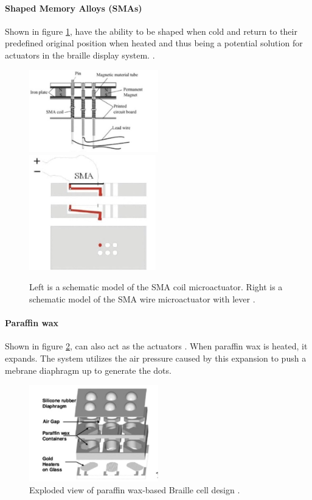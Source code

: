 \paragraph{Shaped Memory Alloys (SMAs)}
Shown in figure \ref{fig:sma}, have the ability to be shaped when cold and return to their predefined original position when heated and thus being a potential solution for actuators in the braille display system. \cite{chaves_microtuators_2009}.

\begin{figure}[h]\centering
    \includegraphics[width=0.5\textwidth]{figures/Coil_SMA_mechanism.png}
    \includegraphics[height=5cm]{figures/sma-mechanism.png}
    \caption[Schematics of Shaped Memory Alloy (SMA) mechanisms]{ Left is a schematic model of the SMA coil microactuator. Right is a schematic model of the SMA wire microactuator with lever \cite{haga_dynamic_2005}.}
    \label{fig:sma}
\end{figure}

\paragraph{Paraffin wax}
Shown in figure \ref{fig:paraffin}, can also act as the actuators \cite{lee_micromachined_2005}. When paraffin wax is heated, it expands.
The system utilizes the air pressure caused by this expansion to push a mebrane diaphragm up to generate the dots.

\begin{figure}[h] \centering
    \includegraphics[width=0.5\textwidth]{figures/paraffin.png}
\caption[Paraffin-based Braille cell]{Exploded view of paraffin wax-based Braille cell design \cite{lee_micromachined_2005}.}
\label{fig:paraffin}
\end{figure}
